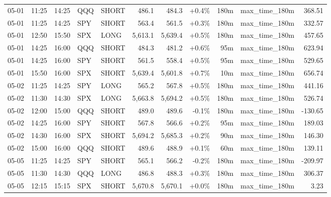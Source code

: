 \documentclass[11pt,a4paper,twoside]{article}
\begin{document}
\begin{center}
\begin{longtable}{>{\color{txtmain}}l l l l l r r r r >{\color{txtmain}}l r}
05-01 & 11:25 & 14:25 & QQQ & SHORT & 486.1 & 484.3 & \textcolor{wingreen}{+0.4\%} & 180m & max\_time\_180m & \textcolor{wingreen}{368.51} \\
05-01 & 11:25 & 14:25 & SPY & SHORT & 563.4 & 561.5 & \textcolor{wingreen}{+0.3\%} & 180m & max\_time\_180m & \textcolor{wingreen}{332.57} \\
05-01 & 12:50 & 15:50 & SPX & LONG & 5,613.1 & 5,639.4 & \textcolor{wingreen}{+0.5\%} & 180m & max\_time\_180m & \textcolor{wingreen}{457.65} \\
05-01 & 14:25 & 16:00 & QQQ & SHORT & 484.3 & 481.2 & \textcolor{wingreen}{+0.6\%} & 95m & max\_time\_180m & \textcolor{wingreen}{623.94} \\
05-01 & 14:25 & 16:00 & SPY & SHORT & 561.5 & 558.4 & \textcolor{wingreen}{+0.5\%} & 95m & max\_time\_180m & \textcolor{wingreen}{529.65} \\
05-01 & 15:50 & 16:00 & SPX & SHORT & 5,639.4 & 5,601.8 & \textcolor{wingreen}{+0.7\%} & 10m & max\_time\_180m & \textcolor{wingreen}{656.74} \\
05-02 & 11:25 & 14:25 & SPY & LONG & 565.2 & 567.8 & \textcolor{wingreen}{+0.5\%} & 180m & max\_time\_180m & \textcolor{wingreen}{441.16} \\
05-02 & 11:30 & 14:30 & SPX & LONG & 5,663.8 & 5,694.2 & \textcolor{wingreen}{+0.5\%} & 180m & max\_time\_180m & \textcolor{wingreen}{526.74} \\
05-02 & 12:00 & 15:00 & QQQ & SHORT & 489.0 & 489.6 & \textcolor{lossred}{-0.1\%} & 180m & max\_time\_180m & \textcolor{lossred}{-130.65} \\
05-02 & 14:25 & 16:00 & SPY & SHORT & 567.8 & 566.6 & \textcolor{wingreen}{+0.2\%} & 95m & max\_time\_180m & \textcolor{wingreen}{189.03} \\
05-02 & 14:30 & 16:00 & SPX & SHORT & 5,694.2 & 5,685.3 & \textcolor{wingreen}{+0.2\%} & 90m & max\_time\_180m & \textcolor{wingreen}{146.30} \\
05-02 & 15:00 & 16:00 & QQQ & SHORT & 489.6 & 488.9 & \textcolor{wingreen}{+0.1\%} & 60m & max\_time\_180m & \textcolor{wingreen}{139.11} \\
05-05 & 11:25 & 14:25 & SPY & SHORT & 565.1 & 566.2 & \textcolor{lossred}{-0.2\%} & 180m & max\_time\_180m & \textcolor{lossred}{-209.97} \\
05-05 & 11:30 & 14:30 & QQQ & LONG & 486.8 & 488.3 & \textcolor{wingreen}{+0.3\%} & 180m & max\_time\_180m & \textcolor{wingreen}{306.37} \\
05-05 & 12:15 & 15:15 & SPX & SHORT & 5,670.8 & 5,670.1 & \textcolor{wingreen}{+0.0\%} & 180m & max\_time\_180m & \textcolor{wingreen}{3.23} \\

\end{longtable}
\end{center}
\end{document}
